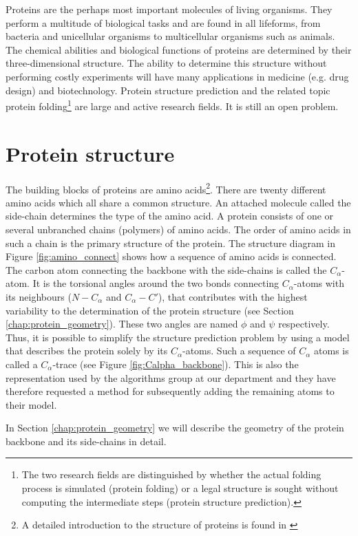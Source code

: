 Proteins are the perhaps most important molecules of living
organisms. They perform a multitude of biological tasks and are found
in all lifeforms, from bacteria and unicellular organisms to
multicellular organisms such as animals. The chemical abilities and
biological functions of proteins are determined by their
three-dimensional structure. The ability to determine this structure
without performing costly experiments will have many applications in
medicine (e.g. drug design) and biotechnology. Protein structure
prediction and the related topic protein folding\footnote{The two
  research fields are distinguished by whether the actual folding
  process is simulated (protein folding) or a legal structure is
  sought without computing the intermediate steps (protein structure
  prediction).} are large and active research fields. It is still an
open problem.

\section{Protein structure}
The building blocks of proteins are amino acids\footnote{A detailed
  introduction to the structure of proteins is found in
  \cite{branden}}. There are twenty different amino acids which all
share a common structure. An attached molecule called the side-chain
determines the type of the amino acid. A protein consists of one or
several unbranched chains (polymers) of amino acids. The order of
amino acids in such a chain is the primary structure of the protein.
The structure diagram in Figure \ref{fig:amino_connect} shows how a
sequence of amino acids is connected. The carbon atom connecting the
backbone with the side-chains is called the $C_\alpha$-atom. It is the
torsional angles around the two bonds connecting $C_\alpha$-atoms with
its neighbours ($N-C_\alpha$ and $C_\alpha-C'$), that contributes with
the highest variability to the determination of the protein structure
(see Section \ref{chap:protein_geometry}). These two angles are named
$\phi$ and $\psi$ respectively. Thus, it is possible to simplify the
structure prediction problem by using a model that describes the
protein solely by its $C_\alpha$-atoms. Such a sequence of
$C_{\alpha}$ atoms is called a $C_{\alpha}$-trace (see Figure
\ref{fig:Calpha_backbone}). This is also the representation used by
the algorithms group at our department and they have therefore
requested a method for subsequently adding the remaining atoms to
their model.

In Section \ref{chap:protein_geometry} we will describe the geometry
of the protein backbone and its side-chains in detail.


